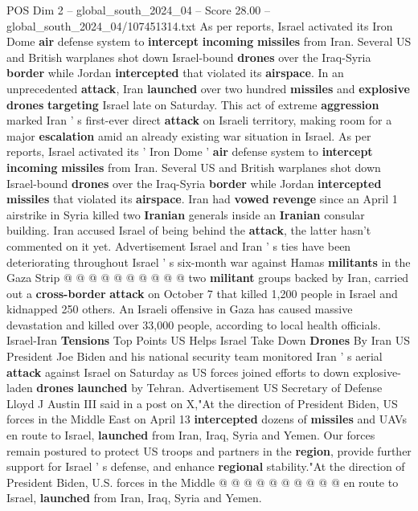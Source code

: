 \begin{textsample}{POS Dim 2 – global\_south\_2024\_04 – Score 28.00 – global\_south\_2024\_04/107451314.txt}  \label{ex:f2_pos_044}
As per reports, Israel activated its Iron Dome \textbf{air} defense system to \textbf{intercept} \textbf{incoming} \textbf{missiles} from Iran.
Several US and British warplanes shot down Israel-bound \textbf{drones} over the Iraq-Syria \textbf{border} while Jordan \textbf{intercepted} that violated its \textbf{airspace}.
In an unprecedented \textbf{attack}, Iran \textbf{launched} over two hundred \textbf{missiles} and \textbf{explosive} \textbf{drones} \textbf{targeting} Israel late on Saturday.
This act of extreme \textbf{aggression} marked Iran ' s first-ever direct \textbf{attack} on Israeli territory, making room for a major \textbf{escalation} amid an already existing war situation in Israel.
As per reports, Israel activated its ' Iron Dome ' \textbf{air} defense system to \textbf{intercept} \textbf{incoming} \textbf{missiles} from Iran.
Several US and British warplanes shot down Israel-bound \textbf{drones} over the Iraq-Syria \textbf{border} while Jordan \textbf{intercepted} \textbf{missiles} that violated its \textbf{airspace}.
Iran had \textbf{vowed} \textbf{revenge} since an April 1 airstrike in Syria killed two \textbf{Iranian} generals inside an \textbf{Iranian} consular building.
Iran accused Israel of being behind the \textbf{attack}, the latter hasn't commented on it yet.
Advertisement Israel and Iran ' s ties have been deteriorating throughout Israel ' s six-month war against Hamas \textbf{militants} in the Gaza Strip @ @ @ @ @ @ @ @ @ @ two \textbf{militant} groups backed by Iran, carried out a \textbf{cross-border} \textbf{attack} on October 7 that killed 1,200 people in Israel and kidnapped 250 others.
An Israeli offensive in Gaza has caused massive devastation and killed over 33,000 people, according to local health officials.
Israel-Iran \textbf{Tensions} Top Points US Helps Israel Take Down \textbf{Drones} By Iran US President Joe Biden and his national security team monitored Iran ' s aerial \textbf{attack} against Israel on Saturday as US forces joined efforts to down explosive-laden \textbf{drones} \textbf{launched} by Tehran.
Advertisement US Secretary of Defense Lloyd J Austin III said in a post on X,"At the direction of President Biden, US forces in the Middle East on April 13 \textbf{intercepted} dozens of \textbf{missiles} and UAVs en route to Israel, \textbf{launched} from Iran, Iraq, Syria and Yemen.
Our forces remain postured to protect US troops and partners in the \textbf{region}, provide further support for Israel ' s defense, and enhance \textbf{regional} stability."At the direction of President Biden, U.S. forces in the Middle @ @ @ @ @ @ @ @ @ @ en route to Israel, \textbf{launched} from Iran, Iraq, Syria and Yemen.

\end{textsample}
